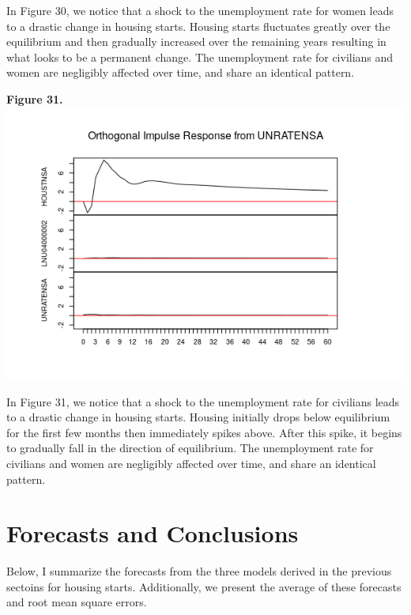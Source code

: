 \documentclass[11pt]{article}
\begin{document}
In Figure 30, we notice that a shock to the unemployment rate for women leads to a drastic change in housing starts. Housing starts fluctuates greatly over the equilibrium and then gradually increased over the remaining years resulting in what looks to be a permanent change. The unemployment rate for civilians and women are negligibly affected over time, and share an identical pattern.
\begin{center}
\textbf{Figure 31.}
\\
\includegraphics[scale=1]{urShock}
\end{center}
In Figure 31, we notice that a shock to the unemployment rate for civilians leads to a drastic change in housing starts. Housing initially drops below equilibrium for the first few months then immediately spikes above. After this spike, it begins to gradually fall in the direction of equilibrium. The unemployment rate for civilians and women are negligibly affected over time, and share an identical pattern.
\section{Forecasts and Conclusions}
Below, I summarize the forecasts from the three models derived in the previous sectoins for housing starts. Additionally, we present the average of these forecasts and root mean square errors.
\end{document}
